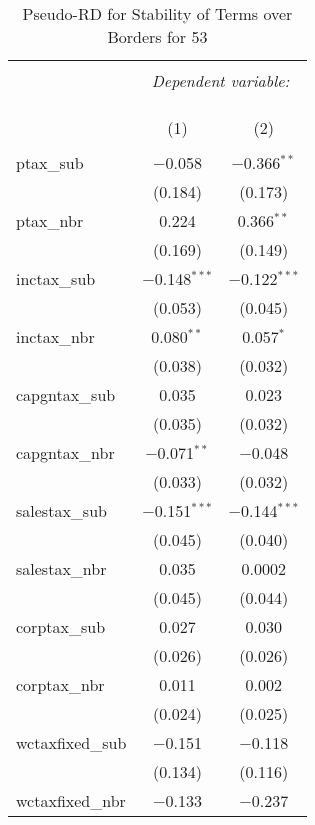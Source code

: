 
\begin{table}[!htbp] \centering 
  \caption{Pseudo-RD for Stability of Terms over Borders for  53} 
  \label{} 
\begin{tabular}{@{\extracolsep{5pt}}lcc} 
\\[-1.8ex]\hline 
\hline \\[-1.8ex] 
 & \multicolumn{2}{c}{\textit{Dependent variable:}} \\ 
\cline{2-3} 
\\[-1.8ex] & \multicolumn{2}{c}{ } \\ 
\\[-1.8ex] & (1) & (2)\\ 
\hline \\[-1.8ex] 
 ptax\_sub & $-$0.058 & $-$0.366$^{**}$ \\ 
  & (0.184) & (0.173) \\ 
  ptax\_nbr & 0.224 & 0.366$^{**}$ \\ 
  & (0.169) & (0.149) \\ 
  inctax\_sub & $-$0.148$^{***}$ & $-$0.122$^{***}$ \\ 
  & (0.053) & (0.045) \\ 
  inctax\_nbr & 0.080$^{**}$ & 0.057$^{*}$ \\ 
  & (0.038) & (0.032) \\ 
  capgntax\_sub & 0.035 & 0.023 \\ 
  & (0.035) & (0.032) \\ 
  capgntax\_nbr & $-$0.071$^{**}$ & $-$0.048 \\ 
  & (0.033) & (0.032) \\ 
  salestax\_sub & $-$0.151$^{***}$ & $-$0.144$^{***}$ \\ 
  & (0.045) & (0.040) \\ 
  salestax\_nbr & 0.035 & 0.0002 \\ 
  & (0.045) & (0.044) \\ 
  corptax\_sub & 0.027 & 0.030 \\ 
  & (0.026) & (0.026) \\ 
  corptax\_nbr & 0.011 & 0.002 \\ 
  & (0.024) & (0.025) \\ 
  wctaxfixed\_sub & $-$0.151 & $-$0.118 \\ 
  & (0.134) & (0.116) \\ 
  wctaxfixed\_nbr & $-$0.133 & $-$0.237 \\ 

\end{tabular}
\end{table}
